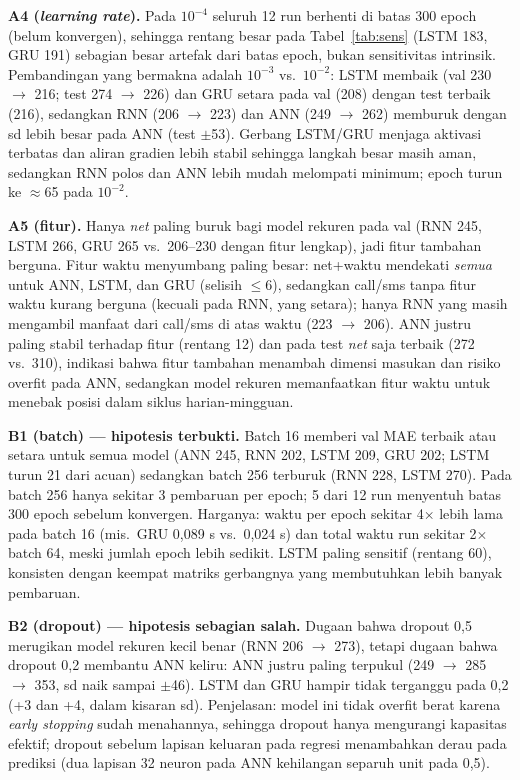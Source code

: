 \documentclass[conference,a4paper]{IEEEtran}
\begin{document}
\textbf{A4 (\textit{learning rate}).} Pada $10^{-4}$ seluruh 12 run berhenti di batas 300 epoch (belum konvergen), sehingga rentang besar pada Tabel~\ref{tab:sens} (LSTM 183, GRU 191) sebagian besar artefak dari batas epoch, bukan sensitivitas intrinsik. Pembandingan yang bermakna adalah $10^{-3}$ vs.\ $10^{-2}$: LSTM membaik (val 230 $\to$ 216; test 274 $\to$ 226) dan GRU setara pada val (208) dengan test terbaik (216), sedangkan RNN (206 $\to$ 223) dan ANN (249 $\to$ 262) memburuk dengan sd lebih besar pada ANN (test $\pm$53). Gerbang LSTM/GRU menjaga aktivasi terbatas dan aliran gradien lebih stabil sehingga langkah besar masih aman, sedangkan RNN polos dan ANN lebih mudah melompati minimum; epoch turun ke $\approx$65 pada $10^{-2}$.

\textbf{A5 (fitur).} Hanya \textit{net} paling buruk bagi model rekuren pada val (RNN 245, LSTM 266, GRU 265 vs.\ 206--230 dengan fitur lengkap), jadi fitur tambahan berguna. Fitur waktu menyumbang paling besar: net+waktu mendekati \textit{semua} untuk ANN, LSTM, dan GRU (selisih $\le$6), sedangkan call/sms tanpa fitur waktu kurang berguna (kecuali pada RNN, yang setara); hanya RNN yang masih mengambil manfaat dari call/sms di atas waktu (223 $\to$ 206). ANN justru paling stabil terhadap fitur (rentang 12) dan pada test \textit{net} saja terbaik (272 vs.\ 310), indikasi bahwa fitur tambahan menambah dimensi masukan dan risiko overfit pada ANN, sedangkan model rekuren memanfaatkan fitur waktu untuk menebak posisi dalam siklus harian-mingguan.

\textbf{B1 (batch) --- hipotesis terbukti.} Batch 16 memberi val MAE terbaik atau setara untuk semua model (ANN 245, RNN 202, LSTM 209, GRU 202; LSTM turun 21 dari acuan) sedangkan batch 256 terburuk (RNN 228, LSTM 270). Pada batch 256 hanya sekitar 3 pembaruan per epoch; 5 dari 12 run menyentuh batas 300 epoch sebelum konvergen. Harganya: waktu per epoch sekitar 4$\times$ lebih lama pada batch 16 (mis.\ GRU 0,089 s vs.\ 0,024 s) dan total waktu run sekitar 2$\times$ batch 64, meski jumlah epoch lebih sedikit. LSTM paling sensitif (rentang 60), konsisten dengan keempat matriks gerbangnya yang membutuhkan lebih banyak pembaruan.

\textbf{B2 (dropout) --- hipotesis sebagian salah.} Dugaan bahwa dropout 0,5 merugikan model rekuren kecil benar (RNN 206 $\to$ 273), tetapi dugaan bahwa dropout 0,2 membantu ANN keliru: ANN justru paling terpukul (249 $\to$ 285 $\to$ 353, sd naik sampai $\pm$46). LSTM dan GRU hampir tidak terganggu pada 0,2 (+3 dan +4, dalam kisaran sd). Penjelasan: model ini tidak overfit berat karena \textit{early stopping} sudah menahannya, sehingga dropout hanya mengurangi kapasitas efektif; dropout sebelum lapisan keluaran pada regresi menambahkan derau pada prediksi (dua lapisan 32 neuron pada ANN kehilangan separuh unit pada 0,5).
\end{document}
